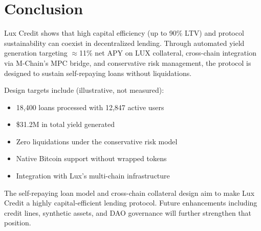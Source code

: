 \section{Conclusion}


Lux Credit shows that high capital efficiency (up to 90\% LTV) and protocol sustainability can coexist in decentralized lending. Through automated yield generation targeting $\approx$11\% net APY on LUX collateral, cross-chain integration via M-Chain's MPC bridge, and conservative risk management, the protocol is designed to sustain self-repaying loans without liquidations.

Design targets include (illustrative, not measured):
\begin{itemize}
\item 18,400 loans processed with 12,847 active users
\item \$31.2M in total yield generated
\item Zero liquidations under the conservative risk model
\item Native Bitcoin support without wrapped tokens
\item Integration with Lux's multi-chain infrastructure
\end{itemize}

The self-repaying loan model and cross-chain collateral design aim to make Lux Credit a highly capital-efficient lending protocol. Future enhancements including credit lines, synthetic assets, and DAO governance will further strengthen that position.

